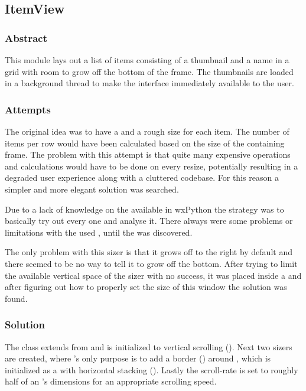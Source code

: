 \subsection{ItemView}
\def\kapitelautor{Clemens Stadlbauer}

\subsubsection{Abstract}
This module lays out a list of items consisting of a thumbnail and a name in a
grid with room to grow off the bottom of the frame. The thumbnails are loaded
in a background thread to make the interface immediately available to the user.

\subsubsection{Attempts}
The original idea was to have a  and a rough size for each
item. The number of items per row would have been calculated based on the size
of the containing frame. The problem with this attempt is that quite many
expensive operations and calculations would have to be done on every resize,
potentially resulting in a degraded user experience along with a cluttered
codebase. For this reason a simpler and more elegant solution was searched.

Due to a lack of knowledge on the available  in
wxPython the strategy was to basically try out every one and
analyse it. There always were some problems or limitations with the used
, until the  was discovered.

The only problem with this sizer is that it grows off to the right by default
and there seemed to be no way to tell it to grow off the bottom. After trying
to limit the available vertical space of the sizer with no success, it was
placed inside a  and after figuring out how to properly
set the size of this window the solution was found.

\subsubsection{Solution} %

\begin{sloppypar}
The  class extends from  and is
initialized to vertical scrolling (). Next
two sizers are created, where 's only purpose is to add a
border () around
, which is initialized as a  with horizontal
stacking (). Lastly the scroll-rate is set
to roughly half of an 's dimensions for an appropriate scrolling
speed.
\end{sloppypar}

